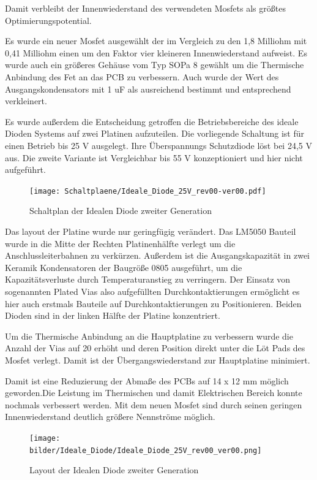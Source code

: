 Damit verbleibt der Innenwiederstand des verwendeten Mosfets als größtes Optimierungspotential.

Es wurde ein neuer Mosfet ausgewählt der im Vergleich zu den 1,8 Milliohm mit 0,41 Milliohm einen um den Faktor vier kleineren Innenwiederstand aufweist. Es wurde auch ein größeres Gehäuse vom Typ SOPa 8 gewählt um die Thermische Anbindung des Fet an das PCB zu verbessern.
Auch wurde der Wert des Ausgangskondensators mit 1 uF als ausreichend bestimmt und entsprechend verkleinert.

Es wurde außerdem die Entscheidung getroffen die Betriebsbereiche des ideale Dioden Systems auf zwei Platinen aufzuteilen. Die vorliegende Schaltung ist für einen Betrieb bis 25 V ausgelegt. Ihre Überspannungs Schutzdiode löst bei 24,5 V aus.
Die zweite Variante ist Vergleichbar bis 55 V konzeptioniert und hier nicht aufgeführt.


\begin{figure}[H]
\centering
\texttt{[image: Schaltplaene/Ideale\_Diode\_25V\_rev00-ver00.pdf]} 
\caption{Schaltplan der Idealen Diode zweiter Generation} 
\label{fig:Schaltplan der Idealen Diode zweiter Generation}
\end{figure}

Das layout der Platine wurde nur geringfügig verändert. Das LM5050 Bauteil wurde in die Mitte der Rechten Platinenhälfte verlegt um die Anschlussleiterbahnen zu verkürzen. Außerdem ist die Ausgangskapazität in zwei Keramik Kondensatoren der Baugröße 0805 ausgeführt, um die Kapazitätsverluste durch Temperaturanstieg zu verringern.
Der Einsatz von sogenannten Plated Vias also aufgefüllten Durchkontaktierungen ermöglicht es hier auch erstmals Bauteile auf Durchkontaktierungen zu Positionieren.
Beiden Dioden sind in der linken Hälfte der Platine konzentriert.

Um die Thermische Anbindung an die Hauptplatine zu verbessern wurde die Anzahl der Vias auf 20 erhöht und deren Position direkt unter die Löt Pads des Mosfet verlegt. Damit ist der Übergangswiederstand \cite{Heat_Transfer}zur Hauptplatine minimiert.

Damit ist eine Reduzierung der Abmaße des PCBs auf 14 x 12 mm möglich geworden.Die Leistung im Thermischen und damit Elektrischen Bereich konnte nochmals verbessert werden. Mit dem neuen Mosfet sind durch seinen geringen Innenwiederstand deutlich größere Nennströme möglich.


\begin{figure}[H]
\centering
\texttt{[image: bilder/Ideale\_Diode/Ideale\_Diode\_25V\_rev00\_ver00.png]} 
\caption{Layout der Idealen Diode zweiter Generation} 
\label{fig:Layout der Idealen Diode zweiter Generation}
\end{figure}



